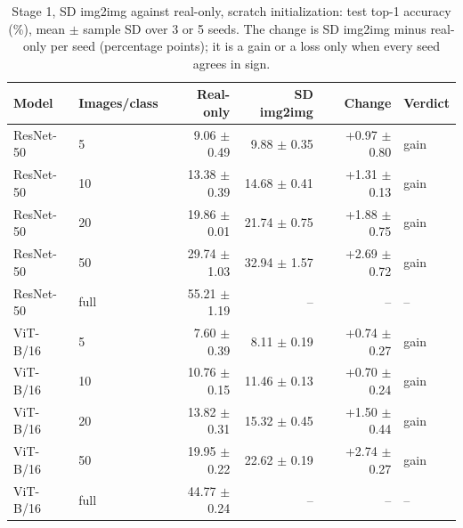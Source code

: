 \begin{table}[H]
\centering
\caption{Stage 1, SD img2img against real-only, scratch initialization: test top-1 accuracy (\%), mean $\pm$ sample SD over 3 or 5 seeds. The change is SD img2img minus real-only per seed (percentage points); it is a gain or a loss only when every seed agrees in sign.}
\label{tab:stage1-scratch-accuracy-sd_img2img-test}
\begin{tabular}{llrrrl}
\toprule
Model & Images/class & Real-only & SD img2img & Change & Verdict \\
\midrule
ResNet-50 & 5 & 9.06 $\pm$ 0.49 & 9.88 $\pm$ 0.35 & +0.97 $\pm$ 0.80 & gain \\
ResNet-50 & 10 & 13.38 $\pm$ 0.39 & 14.68 $\pm$ 0.41 & +1.31 $\pm$ 0.13 & gain \\
ResNet-50 & 20 & 19.86 $\pm$ 0.01 & 21.74 $\pm$ 0.75 & +1.88 $\pm$ 0.75 & gain \\
ResNet-50 & 50 & 29.74 $\pm$ 1.03 & 32.94 $\pm$ 1.57 & +2.69 $\pm$ 0.72 & gain \\
ResNet-50 & full & 55.21 $\pm$ 1.19 & -- & -- & -- \\
\midrule
ViT-B/16 & 5 & 7.60 $\pm$ 0.39 & 8.11 $\pm$ 0.19 & +0.74 $\pm$ 0.27 & gain \\
ViT-B/16 & 10 & 10.76 $\pm$ 0.15 & 11.46 $\pm$ 0.13 & +0.70 $\pm$ 0.24 & gain \\
ViT-B/16 & 20 & 13.82 $\pm$ 0.31 & 15.32 $\pm$ 0.45 & +1.50 $\pm$ 0.44 & gain \\
ViT-B/16 & 50 & 19.95 $\pm$ 0.22 & 22.62 $\pm$ 0.19 & +2.74 $\pm$ 0.27 & gain \\
ViT-B/16 & full & 44.77 $\pm$ 0.24 & -- & -- & -- \\
\bottomrule
\end{tabular}
\end{table}
